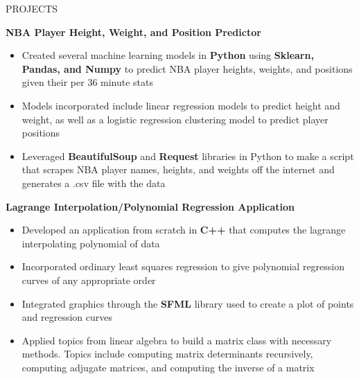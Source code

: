 \documentclass{resume} %
\begin{document}
\vspace{-6pt}

\begin{rSection}{PROJECTS}
\vspace{-1.25em}
\item \textbf{NBA Player Height, Weight, and Position Predictor} %
\vspace{-6pt}
 \begin{itemize}
    \itemsep -6pt {} 
     \item Created several machine learning models in \textbf{Python} using \textbf{Sklearn, Pandas, and Numpy} to predict NBA player heights, weights, and positions given their per 36 minute stats
     \item Models incorporated include linear regression models to predict height and weight, as well as a logistic regression clustering model to predict player positions
    \item Leveraged \textbf{BeautifulSoup} and \textbf{Request} libraries in Python to make a script that scrapes NBA player names, heights, and weights off the internet and generates a .csv file with the data
 \end{itemize}

 \vspace{-4pt}
 
\item \textbf{Lagrange Interpolation/Polynomial Regression Application} %
\vspace{-6pt}
 \begin{itemize}
    \itemsep -6pt {} 
     \item Developed an application from scratch in \textbf{C++} that computes the lagrange interpolating polynomial of data
     \item Incorporated ordinary least squares regression to give polynomial regression curves of any appropriate order
     \item Integrated graphics through the \textbf{SFML} library used to create a plot of points and regression curves
    \item Applied topics from linear algebra to build a matrix class with necessary methods. Topics include computing matrix determinants recursively, computing adjugate matrices, and computing the inverse of a matrix
 \end{itemize}


\end{rSection}
\end{document}
